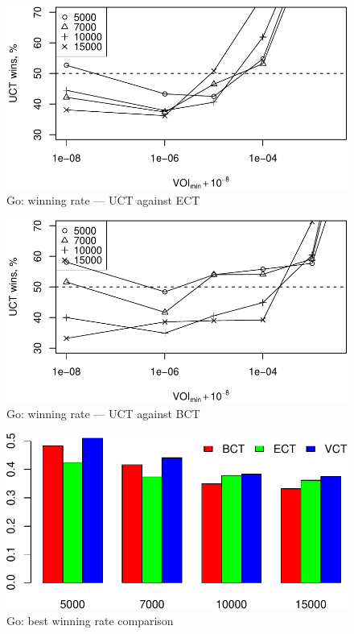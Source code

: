\documentclass{article}
\begin{document}
\begin{figure}[h]
\centering
\includegraphics[scale=0.8]{ect-wins.pdf}
\caption{Go: winning rate --- UCT against ECT}
\label{fig:uct-against-ect}
\end{figure}

\begin{figure}[h]
\centering
\includegraphics[scale=0.8]{bct-wins.pdf}
\caption{Go: winning rate --- UCT against BCT}
\label{fig:uct-against-bct}
\end{figure}

\begin{figure}[h]
\centering
\includegraphics[scale=0.8]{bests-colorful.pdf}
\caption{Go: best winning rate comparison}
\label{fig:best-winning-rate}
\end{figure}
\end{document}
